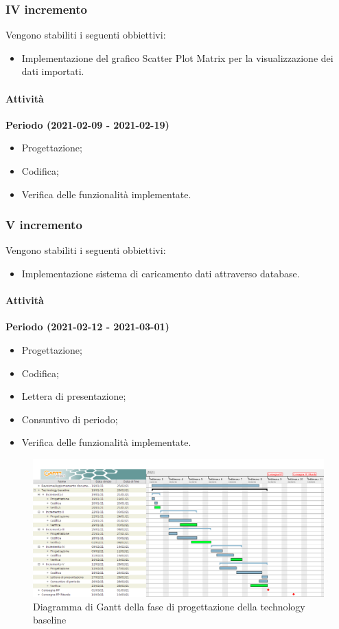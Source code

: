 \documentclass[../piano_di_progetto.tex]{subfiles}
\begin{document}
\subsubsection{IV incremento}
Vengono stabiliti i seguenti obbiettivi:
\begin{itemize}
    \item Implementazione del grafico Scatter Plot Matrix per la visualizzazione dei dati importati.
\end{itemize}
\paragraph{Attività}
\noindent\textbf{Periodo (2021-02-09 - 2021-02-19)}
\begin{itemize}
    \item Progettazione;
    \item Codifica;
    \item Verifica delle funzionalità implementate.
\end{itemize}

\subsubsection{V incremento}
Vengono stabiliti i seguenti obbiettivi:
\begin{itemize}
    \item Implementazione sistema di caricamento dati attraverso database.
\end{itemize}
\paragraph{Attività}
\noindent\textbf{Periodo (2021-02-12 - 2021-03-01)}
\begin{itemize}
    \item Progettazione;
    \item Codifica;
    \item Lettera di presentazione;
    \item Consuntivo di periodo;
    \item Verifica delle funzionalità implementate.
\end{itemize}


\begin{figure}[H]
    \centering
    \includegraphics[width=18cm]{src/img/gantt/4_3_tech_baseline.png}
    \caption{Diagramma di Gantt della fase di progettazione della technology baseline}
\end{figure}
\end{document}
